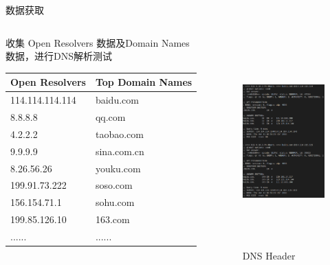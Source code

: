 \documentclass{beamer}
\begin{document}
\begin{frame}{数据获取}
  \begin{columns}
    \begin{column}{0.5\textwidth}
      \small{收集 Open Resolvers 数据及Domain Names 数据，进行DNS解析测试}
      
      \begin{table}
        \scriptsize
      \begin{tabular}{l|l}
        \toprule
        Open Resolvers& Top Domain Names\\
        \midrule
        114.114.114.114 & baidu.com \\
        8.8.8.8 & qq.com \\
        4.2.2.2&     taobao.com \\
        9.9.9.9&  sina.com.cn \\
        
        8.26.56.26& youku.com \\
        
        199.91.73.222& soso.com \\
        
        156.154.71.1& sohu.com \\
        
        199.85.126.10& 163.com \\
        ......&...... \\
        \bottomrule
        \end{tabular}
      \end{table}
    \end{column}
    \begin{column}{0.5\textwidth}
    
      \begin{figure}
        \includegraphics[height=8.09cm,width=5.83cm]{images/digres.png}
        \caption{DNS Header}
        \end{figure}
    \end{column}
    \end{columns}
  
\end{frame}
\end{document}
